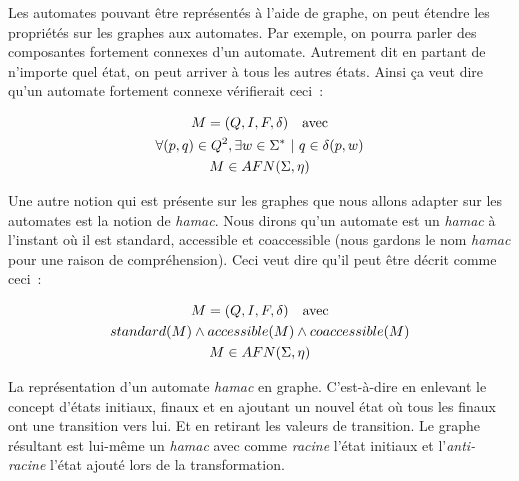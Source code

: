 Les automates pouvant être représentés à l'aide de graphe, on peut étendre les
propriétés sur les graphes aux automates. Par exemple, on pourra parler des
composantes fortement connexes d'un automate. Autrement dit en partant de
n'importe quel état, on peut arriver à tous les autres états. Ainsi ça veut
dire qu'un automate fortement connexe vérifierait ceci~:

\begin{gather*}
    M = (Q, I, F, \delta) \quad \text{avec} \\
    \forall (p, q) \in Q^2, \exists w \in \Sigma^* ~|~ q \in \delta(p, w) \notag \\
    M \in AFN(\Sigma, \eta) \notag
\end{gather*}

\begin{definition}
    Une autre notion qui est présente sur les graphes que nous allons adapter
    sur les automates est la notion de \textit{hamac}. Nous dirons qu'un
    automate est un \textit{hamac} à l'instant où il est standard, accessible et
    coaccessible (nous gardons le nom \textit{hamac} pour une raison de
    compréhension). Ceci veut dire qu'il peut être décrit comme ceci~:

    \begin{gather*}
        M = (Q, I, F, \delta) \quad \text{avec} \\
        standard(M) \land accessible(M) \land coaccessible(M) \\
        M \in AFN(\Sigma, \eta) \notag
    \end{gather*}
\end{definition}

\begin{conjecture}
    La représentation d'un automate \textit{hamac} en graphe. C'est-à-dire en
    enlevant le concept d'états initiaux, finaux et en ajoutant un nouvel état
    où tous les finaux ont une transition vers lui. Et en retirant les valeurs
    de transition. Le graphe résultant est lui-même un \textit{hamac} avec comme
    \textit{racine} l'état initiaux et l'\textit{anti-racine} l'état ajouté lors
    de la transformation.
\end{conjecture}

